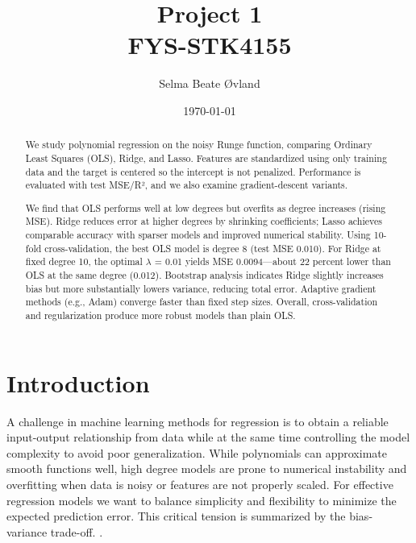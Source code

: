 \documentclass[amssymb,twocolumn,aps]{revtex4-2}
\begin{document}
	
\title{Project 1 \\
    \normalsize FYS-STK4155}
\date{\today}               
\author{Selma Beate Øvland}

\newpage
	
\begin{abstract}

We study polynomial regression on the noisy Runge function, comparing Ordinary Least Squares (OLS), Ridge, and Lasso. Features are standardized using only training data and the target is centered so the intercept is not penalized. Performance is evaluated with test MSE/R², and we also examine gradient-descent variants.

We find that OLS performs well at low degrees but overfits as degree increases (rising MSE). Ridge reduces error at higher degrees by shrinking coefficients; Lasso achieves comparable accuracy with sparser models and improved numerical stability. Using 10-fold cross-validation, the best OLS model is degree 8 (test MSE 0.010). For Ridge at fixed degree 10, the optimal $\lambda$ = 0.01 yields MSE 0.0094—about 22 percent lower than OLS at the same degree (0.012). Bootstrap analysis indicates Ridge slightly increases bias but more substantially lowers variance, reducing total error. Adaptive gradient methods (e.g., Adam) converge faster than fixed step sizes. Overall, cross-validation and regularization produce more robust models than plain OLS.

\end{abstract}


\maketitle

\section{Introduction}
A challenge in machine learning methods for regression is to obtain a reliable input-output relationship from data while at the same time controlling the model complexity to avoid poor generalization. While polynomials can approximate smooth functions well, high degree models are prone to numerical instability and overfitting when data is noisy or features are not properly scaled. For effective regression models we want to balance simplicity and flexibility to minimize the expected prediction error. This critical tension is summarized by the bias-variance trade-off. \cite{compfys39}. \\
\end{document}
